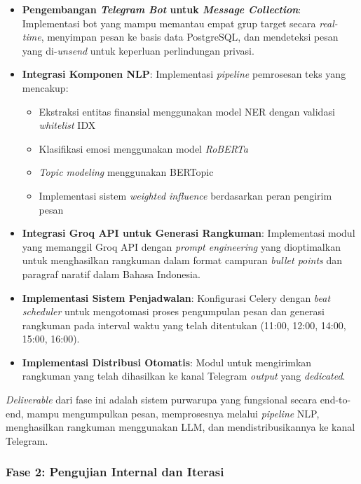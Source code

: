 \begin{itemize}
\item \textbf{Pengembangan \textit{Telegram Bot} untuk \textit{Message Collection}}: Implementasi bot yang mampu memantau empat grup target secara \textit{real-time}, menyimpan pesan ke basis data PostgreSQL, dan mendeteksi pesan yang di-\textit{unsend} untuk keperluan perlindungan privasi.

\item \textbf{Integrasi Komponen NLP}: Implementasi \textit{pipeline} pemrosesan teks yang mencakup:
\begin{itemize}
\item Ekstraksi entitas finansial menggunakan model NER dengan validasi \textit{whitelist} IDX
\item Klasifikasi emosi menggunakan model \textit{RoBERTa}
\item \textit{Topic modeling} menggunakan BERTopic
\item Implementasi sistem \textit{weighted influence} berdasarkan peran pengirim pesan
\end{itemize}

\item \textbf{Integrasi Groq API untuk Generasi Rangkuman}: Implementasi modul yang memanggil Groq API dengan \textit{prompt engineering} yang dioptimalkan untuk menghasilkan rangkuman dalam format campuran \textit{bullet points} dan paragraf naratif dalam Bahasa Indonesia.

\item \textbf{Implementasi Sistem Penjadwalan}: Konfigurasi Celery dengan \textit{beat scheduler} untuk mengotomasi proses pengumpulan pesan dan generasi rangkuman pada interval waktu yang telah ditentukan (11:00, 12:00, 14:00, 15:00, 16:00).

\item \textbf{Implementasi Distribusi Otomatis}: Modul untuk mengirimkan rangkuman yang telah dihasilkan ke kanal Telegram \textit{output} yang \textit{dedicated}.
\end{itemize}

\textit{Deliverable} dari fase ini adalah sistem purwarupa yang fungsional secara end-to-end, mampu mengumpulkan pesan, memprosesnya melalui \textit{pipeline} NLP, menghasilkan rangkuman menggunakan LLM, dan mendistribusikannya ke kanal Telegram.

\subsubsection{Fase 2: Pengujian Internal dan Iterasi}


